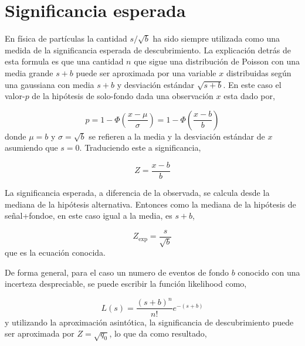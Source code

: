\section{Significancia esperada} %


En física de partículas la cantidad $s/\sqrt{b}$ ha sido siempre utilizada como
una medida de la significancia esperada de descubrimiento. La explicación detrás
de esta formula es que una cantidad $n$ que sigue una distribución de Poisson
con una media grande $s+b$ puede ser aproximada por una variable $x$
distribuidas según una gaussiana con media $s+b$ y desviación estándar
$\sqrt{s+b}$. En este caso el valor-$p$ de la hipótesis de solo-fondo dada una
observación $x$ esta dado por,

\begin{equation}
  p = 1 - \Phi \left( \frac{x-\mu}{\sigma} \right) = 1 - \Phi \left(
  \frac{x-b}{b} \right)
\end{equation}
%
donde $\mu=b$ y $\sigma = \sqrt{b}$ se refieren a la media y la desviación
estándar de $x$ asumiendo que $s=0$. Traduciendo este {\pvalue} a significancia,

\begin{equation}
  Z = \frac{x-b}{b}
\end{equation}

La significancia esperada, a diferencia de la observada, se calcula desde la mediana
de la hipótesis alternativa. Entonces como la mediana de la hipótesis de señal+fondoe,
en este caso igual a la media, es $s+b$,

\begin{equation}
  Z_\text{exp} = \frac{s}{\sqrt{b}}
  \label{eq:Zsimple}
\end{equation}
%
que es la ecuación conocida. %

De forma general, para el caso un numero de eventos de fondo $b$ conocido con
una incerteza despreciable, se puede escribir la función likelihood como,

\begin{equation}
  L(s) = \frac{(s+b)^n}{n!} e^{-(s+b)}
\end{equation}
%
y utilizando la aproximación asintótica, la significancia de descubrimiento
puede ser aproximada por $Z=\sqrt{q_0}$, lo que da como resultado,

